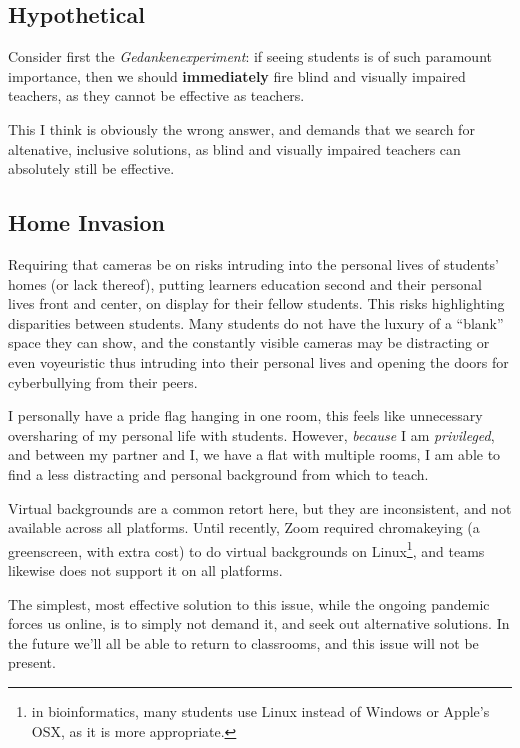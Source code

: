 \documentclass[paper=a4,justified,a4paper]{tufte-handout}
\begin{document}
\hypertarget{hypothetical}{%
\subsection{Hypothetical}\label{hypothetical}}

Consider first the \emph{Gedankenexperiment}: if seeing students is of
such paramount importance, then we should \textbf{immediately} fire
blind and visually impaired teachers, as they cannot be effective as
teachers.

This I think is obviously the wrong answer, and demands that we search
for altenative, inclusive solutions, as blind and visually impaired
teachers can absolutely still be effective\citep{afzal2021sighted}.

\hypertarget{home-invasion}{%
\subsection{Home Invasion}\label{home-invasion}}

Requiring that cameras be on risks intruding into the personal lives of
students' homes (or lack thereof), putting learners education second and
their personal lives front and center, on display for their fellow
students. This risks highlighting disparities between students. Many
students do not have the luxury of a ``blank'' space they can show, and
the constantly visible cameras may be distracting or even voyeuristic
\citep{reed_2020, ng2020communicative} thus intruding into their
personal lives and opening the doors for cyberbullying from their peers.

I personally have a pride flag hanging in one room, this feels like
unnecessary oversharing of my personal life with students. However,
\emph{because} I am \emph{privileged}, and between my partner and I, we
have a flat with multiple rooms, I am able to find a less distracting
and personal background from which to teach.

Virtual backgrounds are a common retort here, but they are inconsistent,
and not available across all platforms. Until recently, Zoom required
chromakeying (a greenscreen, with extra cost) to do virtual backgrounds
on
Linux\footnote{in bioinformatics, many students use Linux instead of Windows or Apple's OSX, as it is more appropriate.},
and teams likewise does not support it on all platforms.

The simplest, most effective solution to this issue, while the ongoing
pandemic forces us online, is to simply not demand it, and seek out
alternative solutions. In the future we'll all be able to return to
classrooms, and this issue will not be present.
\end{document}
